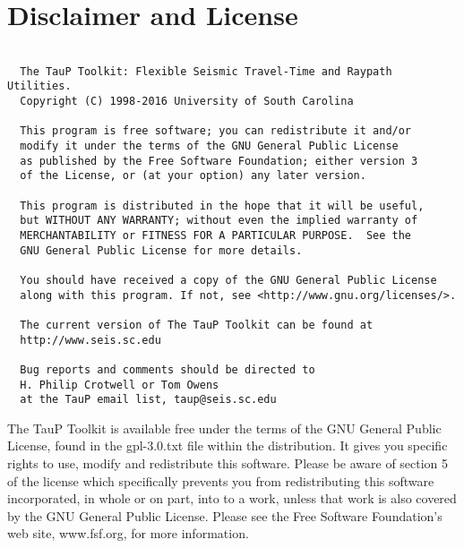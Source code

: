 
\section*{Disclaimer and License}
\begin{verbatim}

  The TauP Toolkit: Flexible Seismic Travel-Time and Raypath Utilities.
  Copyright (C) 1998-2016 University of South Carolina

  This program is free software; you can redistribute it and/or
  modify it under the terms of the GNU General Public License
  as published by the Free Software Foundation; either version 3
  of the License, or (at your option) any later version.

  This program is distributed in the hope that it will be useful,
  but WITHOUT ANY WARRANTY; without even the implied warranty of
  MERCHANTABILITY or FITNESS FOR A PARTICULAR PURPOSE.  See the
  GNU General Public License for more details.

  You should have received a copy of the GNU General Public License
  along with this program. If not, see <http://www.gnu.org/licenses/>.

  The current version of The TauP Toolkit can be found at 
  http://www.seis.sc.edu

  Bug reports and comments should be directed to 
  H. Philip Crotwell or Tom Owens
  at the TauP email list, taup@seis.sc.edu

\end{verbatim}

The TauP Toolkit is available free under the terms of the GNU General Public 
License, found in the gpl-3.0.txt file within the distribution. It gives you 
specific rights to use, modify and redistribute this software. Please be
aware of section 5 of the license which specifically prevents you from 
redistributing this software incorporated, in whole
or on part, into to a work, unless that work is also covered by the 
GNU General Public License. Please see the Free Software Foundation's
web site, www.fsf.org, for more information.

